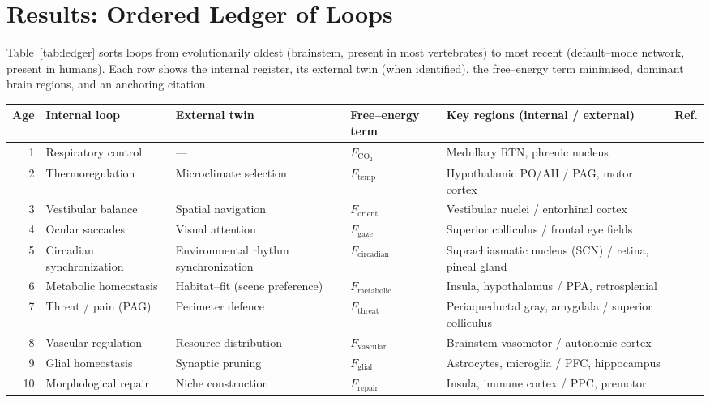 \documentclass[10pt]{article}
\begin{document}
\section{Results: Ordered Ledger of Loops}
Table~\ref{tab:ledger} sorts loops from evolutionarily oldest (brainstem, present in most vertebrates) to most recent (default--mode network, present in humans).  
Each row shows the internal register, its external twin (when identified), the free--energy term minimised, dominant brain regions, and an anchoring citation.

\begin{table}[ht]
\centering
\small
\begin{tabular}{@{}r p{3.0cm} p{3.0cm} p{2.3cm} p{3.5cm} p{1.2cm}@{}}
\toprule
\textbf{Age} & \textbf{Internal loop} & \textbf{External twin} & \textbf{Free--energy term} & \textbf{Key regions (internal / external)} & \textbf{Ref.}\\
\midrule
1 & Respiratory control & --- & $F_{\text{CO}_2}$ & Medullary RTN, phrenic nucleus & \cite{guyenet2015co2}\\
2 & Thermoregulation & Microclimate selection & $F_{\text{temp}}$ & Hypothalamic PO/AH / PAG, motor cortex & \cite{tan2016warm}\\
3 & Vestibular balance & Spatial navigation & $F_{\text{orient}}$ & Vestibular nuclei / entorhinal cortex & \cite{angelaki2022vestibular}\\
4 & Ocular saccades & Visual attention & $F_{\text{gaze}}$ & Superior colliculus / frontal eye fields & \cite{white2022saccade}\\
5 & Circadian synchronization & Environmental rhythm synchronization & $F_{\text{circadian}}$ & Suprachiasmatic nucleus (SCN) / retina, pineal gland & \cite{patton2023circadian}\\
6 & Metabolic homeostasis & Habitat--fit (scene preference) & $F_{\text{metabolic}}$ & Insula, hypothalamus / PPA, retrosplenial & \cite{karraza2024metabolic}\\
7 & Threat / pain (PAG) & Perimeter defence & $F_{\text{threat}}$ & Periaqueductal gray, amygdala / superior colliculus & \cite{zhang2023pag}\\
8 & Vascular regulation & Resource distribution & $F_{\text{vascular}}$ & Brainstem vasomotor / autonomic cortex & \cite{iadecola2023vascular}\\
9 & Glial homeostasis & Synaptic pruning & $F_{\text{glial}}$ & Astrocytes, microglia / PFC, hippocampus & \cite{freeman2023glial}\\
10 & Morphological repair & Niche construction & $F_{\text{repair}}$ & Insula, immune cortex / PPC, premotor & \cite{koren2021immune}\\

\end{tabular}
\end{table}
\end{document}
